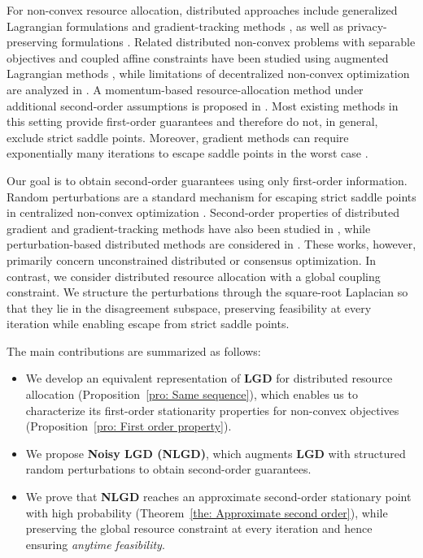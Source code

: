 \documentclass{siamart251216}
\begin{document}
For non-convex resource allocation, distributed approaches include generalized Lagrangian formulations and gradient-tracking methods \cite{li2020projection,zhang2020distributed}, as well as privacy-preserving formulations \cite{Beaude2020}. Related distributed non-convex problems with separable objectives and coupled affine constraints have been studied using augmented Lagrangian methods \cite{Houska2016}, while limitations of decentralized non-convex optimization are analyzed in \cite{Hong2022}. A momentum-based resource-allocation method under additional second-order assumptions is proposed in \cite{xia2025distributed}. Most existing methods in this setting provide first-order guarantees and therefore do not, in general, exclude strict saddle points. Moreover, gradient methods can require exponentially many iterations to escape saddle points in the worst case \cite{du2017gradient}.

Our goal is to obtain second-order guarantees using only first-order information. Random perturbations are a standard mechanism for escaping strict saddle points in centralized non-convex optimization \cite{ge2015escaping,jin2017escape,jin2021nonconvex,Davis2022}. Second-order properties of distributed gradient and gradient-tracking methods have also been studied in \cite{Daneshmand2020}, while perturbation-based distributed methods are considered in \cite{vlaski2021distributed,wang2023decentralized,qin2023second}. These works, however, primarily concern unconstrained distributed or consensus optimization. In contrast, we consider distributed resource allocation with a global coupling constraint. We structure the perturbations through the square-root Laplacian so that they lie in the disagreement subspace, preserving feasibility at every iteration while enabling escape from strict saddle points.

The main contributions are summarized as follows:
\begin{itemize}
    \item We develop an equivalent representation of \textbf{LGD} for distributed resource allocation (Proposition~\ref{pro: Same sequence}), which enables us to characterize its first-order stationarity properties for non-convex objectives (Proposition~\ref{pro: First order property}).
    \item We propose \textbf{Noisy LGD (NLGD)}, which augments \textbf{LGD} with structured random perturbations to obtain second-order guarantees.
    \item We prove that \textbf{NLGD} reaches an approximate second-order stationary point with high probability (Theorem~\ref{the: Approximate second order}), while preserving the global resource constraint at every iteration and hence ensuring \emph{anytime feasibility}.
\end{itemize}
\end{document}
